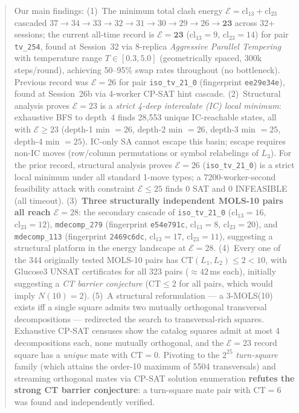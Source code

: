 \documentclass[11pt,a4paper]{article}
\theoremstyle{remark}
\newcommand{\CT}{\mathrm{CT}}
\newcommand{\cl}{\mathrm{cl}}
\newcommand{\E}{\mathcal{E}}
\begin{document}
\begin{abstract}
Our main findings: (1)~The minimum total clash energy $\E = \cl_{13} + \cl_{23}$
cascaded $37 \to 34 \to 33 \to 32 \to 31 \to 30 \to 29 \to 26 \to \mathbf{23}$ across
32+ sessions; the current all-time record is $\E = \mathbf{23}$ ($\cl_{13}=9$,
$\cl_{23}=14$) for pair \texttt{tv\_254}, found at Session~32 via 8-replica
\emph{Aggressive Parallel Tempering} with temperature range $T \in [0.3, 5.0]$
(geometrically spaced, 300k steps/round), achieving 50--95\% swap rates throughout
(no bottleneck). Previous record was $\E = 26$ for pair \texttt{iso\_tv\_21\_0}
(fingerprint \texttt{ee29e34e}), found at Session~26b via 4-worker CP-SAT hint cascade.
(2)~Structural analysis proves $\E=23$ is a \emph{strict 4-deep intercalate (IC) local minimum}:
exhaustive BFS to depth~4 finds 28,553 unique IC-reachable states, all with $\E \geq 23$
(depth-1 min $= 26$, depth-2 min $= 26$, depth-3 min $= 25$, depth-4 min $= 25$).
IC-only SA cannot escape this basin; escape requires non-IC moves (row/column permutations
or symbol relabelings of $L_3$). For the prior record, structural analysis proves
$\E=26$ (\texttt{iso\_tv\_21\_0}) is a strict local minimum under all standard
1-move types; a 7200-worker-second feasibility attack with constraint $\E \leq 25$
finds 0 SAT and 0 INFEASIBLE (all timeout).
(3)~\textbf{Three structurally independent MOLS-10 pairs all reach $\E = 28$}: the
secondary cascade of \texttt{iso\_tv\_21\_0} ($\cl_{13}=16$, $\cl_{23}=12$),
\texttt{mdecomp\_279} (fingerprint \texttt{e54e791c}, $\cl_{13}=8$, $\cl_{23}=20$), and
\texttt{mdecomp\_113} (fingerprint \texttt{2469c6dc}, $\cl_{13}=17$, $\cl_{23}=11$),
suggesting a structural platform in the energy landscape at $\E=28$.
(4)~Every one of the 344 originally tested MOLS-10 pairs has $\CT(L_1,L_2) \leq 2 < 10$, with
Glucose3 UNSAT certificates for all 323 pairs ($\approx 42$\,ms each), initially suggesting a
\emph{CT barrier conjecture} ($\CT \leq 2$ for all pairs, which would imply $N(10)=2$).
(5)~A structural reformulation --- a 3-MOLS(10) exists iff a single square admits two
mutually orthogonal transversal decompositions --- redirected the search to
transversal-rich squares. Exhaustive CP-SAT censuses show the catalog squares admit at
most 4 decompositions each, none mutually orthogonal, and the $\E=23$ record square has a
\emph{unique} mate with $\CT = 0$. Pivoting to the $2^{25}$ \emph{turn-square} family
(which attains the order-10 maximum of 5504 transversals) and streaming orthogonal mates
via CP-SAT solution enumeration \textbf{refutes the strong CT barrier conjecture}: a
turn-square mate pair with $\CT = 6$ was found and independently verified.

\end{abstract}
\end{document}
